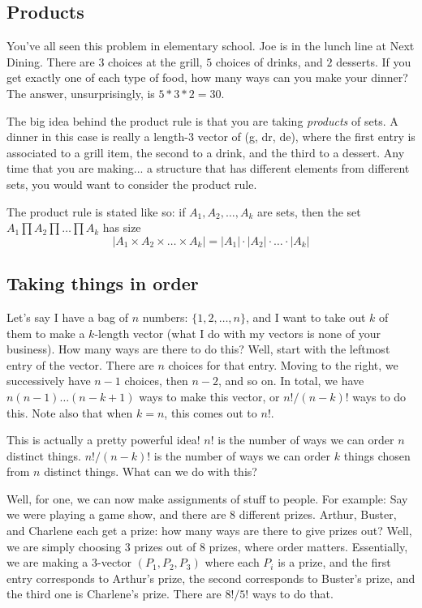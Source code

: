 \documentclass[11pt]{article}
\begin{document}
\subsection{Products}
	You've all seen this problem in elementary school.  Joe is in the lunch line at Next Dining.  There are $3$ choices at the grill, $5$ choices of drinks, and $2$ desserts.  If
	you get exactly one of each type of food, how many ways can you make your dinner?  The answer, unsurprisingly, is $5*3*2 = 30$.
	
	The big idea behind the product rule is that you are taking \emph{products} of sets.  A dinner in this case is really a length-3 vector of (g, dr, de), where the first entry
  is associated to a grill item, the second to a drink, and the third to a dessert.  Any time that you are making... a structure that has different elements from different sets, 
  you would want to consider the product rule.  
  
  The product rule is stated like so: if $A_1, A_2, \ldots, A_k$ are sets, then the set $A_1 \prod A_2 \prod \ldots \prod A_k$ has size
  $$|A_1 \times A_2 \times \ldots \times A_k| = |A_1| \cdot |A_2| \cdot \ldots \cdot |A_k|$$

\subsection{Taking things in order}
	Let's say I have a bag of $n$ numbers: $\{ 1, 2, \ldots, n\}$, and I want to take out $k$ of them to make a $k$-length vector (what I do with my vectors is none of your business).  How
	many ways are there to do this?  Well, start with the leftmost entry of the vector.  There are $n$ choices for that entry.  Moving to the right, we successively have $n-1$ choices, then
	$n-2$, and so on.  In total, we have $n(n-1)\ldots(n-k+1)$ ways to make this vector, or $n!/(n-k)!$ ways to do this.  Note also that when $k=n$, this comes out to $n!$.  
	
	This is actually a pretty powerful idea!  $n!$ is the number of ways we can order $n$ distinct things.  $n!/(n-k)!$ is the number of ways we can order $k$ things chosen from $n$ distinct
	things.  What can we do with this?
	
	Well, for one, we can now make assignments of stuff to people.  For example: Say we were playing a game show, and there are 8 different prizes.  Arthur, Buster, and Charlene each get a 
	prize: how many ways are there to give prizes out?  Well, we are simply choosing $3$ prizes out of $8$ prizes, where order matters.  Essentially, we are making a $3$-vector 
	$(P_1, P_2, P_3)$ where each $P_i$ is a prize, and the first entry corresponds to Arthur's prize, the second corresponds to Buster's prize, and the third one is Charlene's prize.  There are
	$8!/5!$ ways to do that.
	
\end{document}
